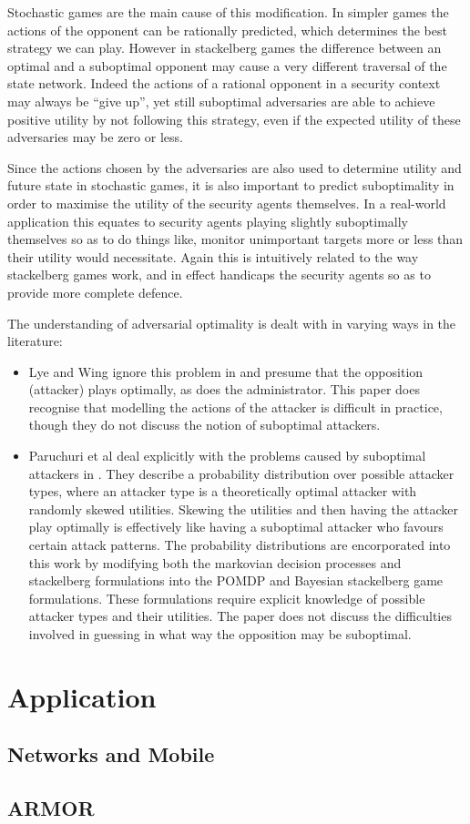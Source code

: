 \documentclass{article}
\begin{document}
Stochastic games are the main cause of this modification.
In simpler games the actions of the opponent can be rationally predicted, which determines the best strategy we can play.
However in stackelberg games the difference between an optimal and a suboptimal opponent may cause a very different traversal of the state network.
Indeed the actions of a rational opponent in a security context may always be ``give up'', yet still suboptimal adversaries are able to achieve positive utility by not following this strategy, even if the expected utility of these adversaries may be zero or less.

Since the actions chosen by the adversaries are also used to determine utility and future state in stochastic games, it is also important to predict suboptimality in order to maximise the utility of the security agents themselves.
In a real-world application this equates to security agents playing slightly suboptimally themselves so as to do things like, monitor unimportant targets more or less than their utility would necessitate.
Again this is intuitively related to the way stackelberg games work, and in effect handicaps the security agents so as to provide more complete defence.

The understanding of adversarial optimality is dealt with in varying ways in the literature:
\begin{itemize}
	\item Lye and Wing ignore this problem in \cite{network} and presume that the opposition (attacker) plays optimally, as does the administrator.
			This paper does recognise that modelling the actions of the attacker is difficult in practice, though they do not discuss the notion of suboptimal attackers.
	\item Paruchuri et al deal explicitly with the problems caused by suboptimal attackers in \cite{random, xrandom, stackelberg}.
			They describe a probability distribution over possible attacker types, where an attacker type is a theoretically optimal attacker with randomly skewed utilities.
			Skewing the utilities and then having the attacker play optimally is effectively like having a suboptimal attacker who favours certain attack patterns.
			The probability distributions are encorporated into this work by modifying both the markovian decision processes and stackelberg formulations into the POMDP and Bayesian stackelberg game formulations.
			These formulations require explicit knowledge of possible attacker types and their utilities.
			The paper does not discuss the difficulties involved in guessing in what way the opposition may be suboptimal.
\end{itemize}

\section{Application}

\subsection{Networks and Mobile}

\subsection{ARMOR}
\label{secARMOR}

\newpage



\end{document}
